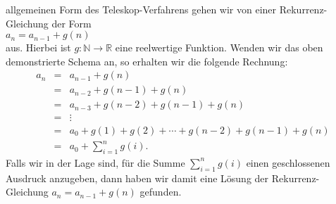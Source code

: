 allgemeinen Form des Teleskop-Verfahrens gehen wir von einer Rekurrenz-Gleichung der Form
\\[0.2cm]
\hspace*{1.3cm}
$a_n = a_{n-1} + g(n)$
\\[0.2cm]
aus.  Hierbei ist $g: \mathbb{N} \rightarrow \mathbb{R}$ eine reelwertige Funktion.
Wenden wir das oben demonstrierte Schema an, so erhalten wir die folgende Rechnung:
\[ 
\begin{array}{lcl}  
  a_n & = & a_{n-1} + g(n) \\
      & = & a_{n-2} + g(n-1) + g(n) \\
      & = & a_{n-3} + g(n-2) + g(n-1) + g(n) \\
      & = & \vdots \\
      & = & a_{0} + g(1) + g(2) + \cdots  + g(n-2) + g(n-1) + g(n) \\[0.2cm]
      & = & a_0 + \sum\limits_{i=1}^{n} g(i).
\end{array}
\]
Falls wir in der Lage sind, f\"ur die Summe $\sum_{i=1}^{n} g(i)$ einen geschlossenen Ausdruck anzugeben,
dann haben wir damit eine L\"osung der Rekurrenz-Gleichung $a_n = a_{n-1} + g(n)$
gefunden.

